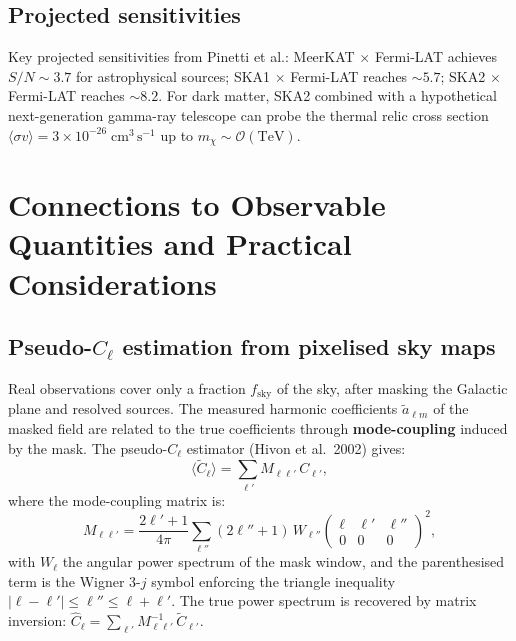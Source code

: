 \documentclass[10pt,a4paper]{article}
\newcommand{\Cl}{C_\ell}
\newcommand{\sigv}{\langle\sigma v\rangle}
\newcommand{\mchi}{m_\chi}
\newcommand{\fsky}{f_{\mathrm{sky}}}
\begin{document}
\subsection{Projected sensitivities}

Key projected sensitivities from Pinetti et al.: MeerKAT $\times$ Fermi-LAT achieves $S/N \sim 3.7$ for astrophysical sources; SKA1 $\times$ Fermi-LAT reaches $\sim 5.7$; SKA2 $\times$ Fermi-LAT reaches $\sim 8.2$. For dark matter, SKA2 combined with a hypothetical next-generation gamma-ray telescope can probe the thermal relic cross section $\sigv = 3 \times 10^{-26} \; \mathrm{cm}^3 \, \mathrm{s}^{-1}$ up to $\mchi \sim \mathcal{O}(\mathrm{TeV})$.


\section{Connections to Observable Quantities and Practical Considerations}
\label{sec:part7}

\subsection{Pseudo-$\Cl$ estimation from pixelised sky maps}

Real observations cover only a fraction $\fsky$ of the sky, after masking the Galactic plane and resolved sources. The measured harmonic coefficients $\tilde{a}_{\ell m}$ of the masked field are related to the true coefficients through \textbf{mode-coupling} induced by the mask. The pseudo-$\Cl$ estimator (Hivon et al.\ 2002) gives:
\begin{equation}
\label{eq:pseudo_Cl}
\langle \tilde{C}_\ell \rangle = \sum_{\ell'} M_{\ell\ell'} \, C_{\ell'},
\end{equation}
where the mode-coupling matrix is:
\begin{equation}
\label{eq:mode_coupling}
M_{\ell\ell'} = \frac{2\ell' + 1}{4\pi} \sum_{\ell''} (2\ell'' + 1) \, W_{\ell''}
\begin{pmatrix} \ell & \ell' & \ell'' \\ 0 & 0 & 0 \end{pmatrix}^2,
\end{equation}
with $W_\ell$ the angular power spectrum of the mask window, and the parenthesised term is the Wigner 3-$j$ symbol enforcing the triangle inequality $|\ell - \ell'| \leq \ell'' \leq \ell + \ell'$. The true power spectrum is recovered by matrix inversion: $\hat{C}_\ell = \sum_{\ell'} M_{\ell\ell'}^{-1} \, \tilde{C}_{\ell'}$.
\end{document}

